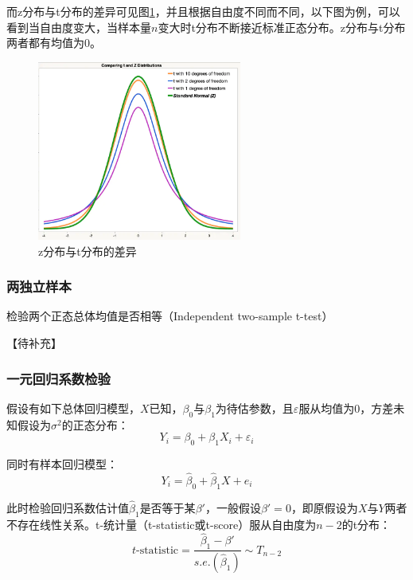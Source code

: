 \documentclass[11pt]{article}
\begin{document}
而z分布与t分布的差异可见图\ref{fig:z-and-t-dist}，并且根据自由度不同而不同，以下图为例，可以看到当自由度变大，当样本量$n$变大时t分布不断接近标准正态分布。z分布与t分布两者都有均值为$0$。
\begin{figure}[H]
    \centering
    \includegraphics[width=0.6\textwidth]{fig/z-dist-and-t-dist.png}
    \caption{z分布与t分布的差异}
    \label{fig:z-and-t-dist}
\end{figure}

\subsubsection{两独立样本}

检验两个正态总体均值是否相等（Independent two-sample t-test）

【待补充】

\subsubsection{一元回归系数检验}

假设有如下总体回归模型，$X$已知，$\beta_0$与$\beta_1$为待估参数，且$\varepsilon$服从均值为0，方差未知假设为$\sigma^2$的正态分布：
\begin{equation*}
    Y_i = \beta_0 + \beta_1 X_i + \varepsilon_i
\end{equation*}

同时有样本回归模型：
\begin{equation*}
    Y_i = \hat{\beta}_0 + \hat{\beta}_1 X + e_i
\end{equation*}

此时检验回归系数估计值$\hat{\beta}_1$是否等于某$\beta'$，一般假设$\beta' = 0$，即原假设为$X$与$Y$两者不存在线性关系。t-统计量（t-statistic或t-score）服从自由度为$n-2$的t分布：
\begin{equation*}
    t\text{-statistic} = \frac{\hat{\beta}_1 - \beta'}{s.e.(\hat{\beta}_1)} \sim T_{n-2}
\end{equation*}
\end{document}
